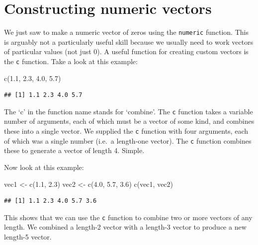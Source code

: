 \documentclass[
]{book}
\newenvironment{Shaded}{\begin{snugshade}}{\end{snugshade}}
\newcommand{\FloatTok}[1]{\textcolor[rgb]{0.00,0.00,0.81}{#1}}
\newcommand{\FunctionTok}[1]{\textcolor[rgb]{0.00,0.00,0.00}{#1}}
\newcommand{\NormalTok}[1]{#1}
\newcommand{\OtherTok}[1]{\textcolor[rgb]{0.56,0.35,0.01}{#1}}
\begin{document}
\hypertarget{constructing-numeric-vectors}{%
\section{Constructing numeric vectors}\label{constructing-numeric-vectors}}

We just saw to make a numeric vector of zeros using the \texttt{numeric} function. This is arguably not a particularly useful skill because we usually need to work vectors of particular values (not just 0). A useful function for creating custom vectors is the \texttt{c} function. Take a look at this example:

\begin{Shaded}
\begin{Highlighting}[]
\FunctionTok{c}\NormalTok{(}\FloatTok{1.1}\NormalTok{, }\FloatTok{2.3}\NormalTok{, }\FloatTok{4.0}\NormalTok{, }\FloatTok{5.7}\NormalTok{)}
\end{Highlighting}
\end{Shaded}

\begin{verbatim}
## [1] 1.1 2.3 4.0 5.7
\end{verbatim}

The `c' in the function name stands for `combine'. The \texttt{c} function takes a variable number of arguments, each of which must be a vector of some kind, and combines these into a single vector. We supplied the \texttt{c} function with four arguments, each of which was a single number (i.e.~a length-one vector). The \texttt{c} function combines these to generate a vector of length 4. Simple.

Now look at this example:

\begin{Shaded}
\begin{Highlighting}[]
\NormalTok{vec1 }\OtherTok{\textless{}{-}} \FunctionTok{c}\NormalTok{(}\FloatTok{1.1}\NormalTok{, }\FloatTok{2.3}\NormalTok{)}
\NormalTok{vec2 }\OtherTok{\textless{}{-}} \FunctionTok{c}\NormalTok{(}\FloatTok{4.0}\NormalTok{, }\FloatTok{5.7}\NormalTok{, }\FloatTok{3.6}\NormalTok{)}
\FunctionTok{c}\NormalTok{(vec1, vec2)}
\end{Highlighting}
\end{Shaded}

\begin{verbatim}
## [1] 1.1 2.3 4.0 5.7 3.6
\end{verbatim}

This shows that we can use the \texttt{c} function to combine two or more vectors of any length. We combined a length-2 vector with a length-3 vector to produce a new length-5 vector.
\end{document}
